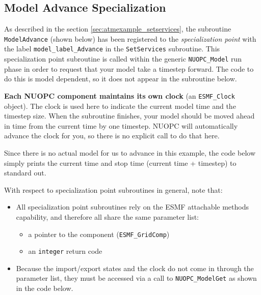 
   \subsection{Model Advance Specialization}
   \label{sec:atmexample_advancespec}
  
   As described in the section \ref{sec:atmexample_setservices},
   the subroutine {\tt ModelAdvance} (shown below) has been
   registered to the \emph{specialization point} with the label
   {\tt model\_label\_Advance} in the {\tt SetServices} subroutine. This
   specialization point subroutine is called within the generic {\tt NUOPC\_Model}
   run phase in order to request that your model take a timestep
   forward.  The code to do this is model dependent, so it does not appear
   in the subroutine below.
  
   \textbf{Each NUOPC component maintains its own clock} (an {\tt ESMF\_Clock} object).
   The clock is used here to indicate the current model time and the
   timestep size. When the subroutine finishes, your model should be
   moved ahead in time from the current time by one timestep.  NUOPC will
   automatically advance the clock for you, so there is no explicit call
   to do that here.
  
   Since there is no actual model for us to advance in this example,
   the code below simply prints the current time and stop time (current time + timestep)
   to standard out.
  
   With respect to specialization point subroutines in general, note that:
   \begin{itemize}
   \item All specialization point subroutines rely on the ESMF attachable
      methods capability, and therefore all share the same parameter list:
   \begin{itemize}
      \item a pointer to the component ({\tt ESMF\_GridComp})
      \item an {\tt integer} return code
   \end{itemize}
   \item Because the import/export states and the clock do not come in through
     the parameter list, they must be accessed via a call to {\tt NUOPC\_ModelGet}
     as shown in the code below.
  \end{itemize} 

